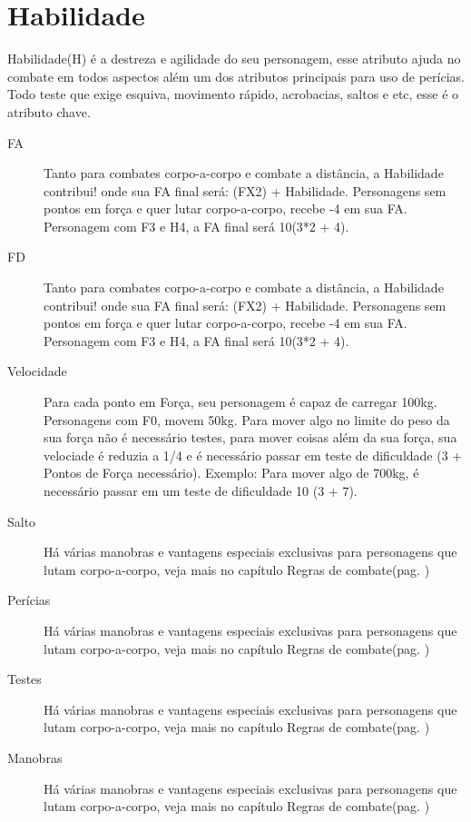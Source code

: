\section{Habilidade}

Habilidade(H) é a destreza e agilidade do seu personagem, esse atributo ajuda no combate em todos aspectos além um dos atributos principais para uso de perícias. Todo teste que exige esquiva, movimento rápido, acrobacias, saltos e etc, esse é o atributo chave.

\begin{description}
\item[FA] Tanto para combates corpo-a-corpo e combate a distância, a Habilidade contribui! onde sua FA final será: (FX2) + Habilidade. Personagens sem pontos em força e quer lutar corpo-a-corpo, recebe -4 em sua FA. Personagem com F3 e H4, a FA final será 10(3*2 + 4). 
\item[FD] Tanto para combates corpo-a-corpo e combate a distância, a Habilidade contribui! onde sua FA final será: (FX2) + Habilidade. Personagens sem pontos em força e quer lutar corpo-a-corpo, recebe -4 em sua FA. Personagem com F3 e H4, a FA final será 10(3*2 + 4). 
\item[Velocidade] Para cada ponto em Força, seu personagem é capaz de carregar 100kg. Personagens com F0, movem 50kg. Para mover algo no limite do peso da sua força não é necessário testes, para mover coisas além da sua força, sua velociade é reduzia a 1/4 e é necessário passar em teste de dificuldade (3 + Pontos de Força necessário). Exemplo: Para mover algo de 700kg, é necessário passar em um teste de dificuldade 10 (3 + 7).
\item[Salto] Há várias manobras e vantagens especiais exclusivas para personagens que lutam corpo-a-corpo, veja mais no capítulo Regras de combate(pag. \pageref{ch:combat})
\item[Perícias] Há várias manobras e vantagens especiais exclusivas para personagens que lutam corpo-a-corpo, veja mais no capítulo Regras de combate(pag. \pageref{ch:combat})
\item[Testes] Há várias manobras e vantagens especiais exclusivas para personagens que lutam corpo-a-corpo, veja mais no capítulo Regras de combate(pag. \pageref{ch:combat})
\item[Manobras] Há várias manobras e vantagens especiais exclusivas para personagens que lutam corpo-a-corpo, veja mais no capítulo Regras de combate(pag. \pageref{ch:combat})
\end{description}

